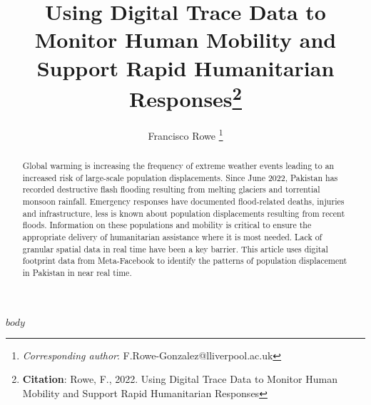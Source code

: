 \documentclass[11pt,letterpaper]{article}
\title{Using Digital Trace Data to Monitor Human Mobility and Support Rapid Humanitarian Responses\footnote{\textbf{Citation}: Rowe, F., 2022. Using Digital Trace Data to Monitor Human Mobility and Support Rapid Humanitarian Responses}}
\author[1]{Francisco Rowe \thanks{\textit{Corresponding author}: F.Rowe-Gonzalez@lliverpool.ac.uk}}
\affil[1]{Geographic Data Science Lab, Department of Geography and Planning, University of Liverpool, Liverpool, United Kingdom}
\date{}
\begin{document}
\maketitle


\begin{abstract}

Global warming is increasing the frequency of extreme weather events leading to an increased risk of large-scale population displacements. 
Since June 2022, Pakistan has recorded destructive flash flooding resulting from melting glaciers and torrential monsoon rainfall. 
Emergency responses have documented flood-related deaths, injuries and infrastructure, less is known about population displacements resulting from recent floods. 
Information on these populations and mobility is critical to ensure the appropriate delivery of humanitarian assistance where it is most needed.
Lack of granular spatial data in real time have been a key barrier.
This article uses digital footprint data from Meta-Facebook to identify the patterns of population displacement in Pakistan in near real time.


\end{abstract}



\pagebreak

$body$




\setlength{\bibsep}{0.00cm plus 0.05cm} %


\end{document}
